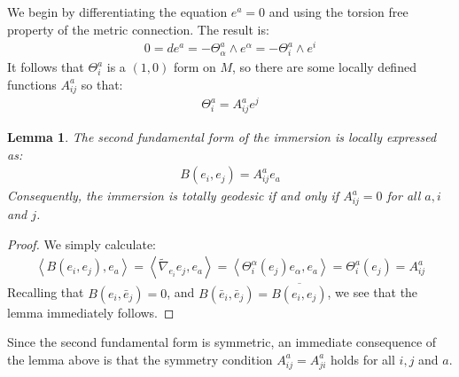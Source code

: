 \documentclass[11pt]{amsart}
\newtheorem{lem}[subsection]{Lemma}
\theoremstyle{definition}
\def \la { \left\langle }
\def \ra { \right\rangle }
\def \nablaamb{ \tilde{\nabla} }
\begin{document}
We begin by differentiating the equation $e^a = 0$ and using the torsion free property of the metric connection.  The result is:
%
\begin{align*}
0 = d e^a = - \Theta^a_{\alpha} \wedge e^{\alpha} = - \Theta^a_i \wedge e^i
\end{align*}
%
It follows that $\Theta^a_i$ is a $(1,0)$ form on $M$, so there are some locally defined functions $A^a_{ij}$ so that:
%
\begin{align}
\Theta^a_i = A^a_{ij} e^j
\end{align}

\begin{lem} The second fundamental form of the immersion is locally expressed as:
%
\begin{align}
B( e_i, e_j ) = A^a_{ij} e_a
\end{align}
%
Consequently, the immersion is totally geodesic if and only if $A^a_{ij} = 0$ for all $a,i$ and $j$.
%
\end{lem}

\begin{proof} We simply calculate:
%
\begin{align*}
\la B(e_i, e_j), e_a \ra = \la \nablaamb_{e_i} e_j, e_a \ra = \la \Theta^{\alpha}_i (e_j) e_{\alpha}, e_a \ra = \Theta^a_i (e_j) = A^a_{ij}
\end{align*}
%
Recalling that $B(e_i, \bar{e}_j) = 0$, and $B(\bar{e}_i, \bar{e}_j ) = \overline{ B(e_i, e_j ) }$, we see that the lemma immediately follows.
%
\end{proof}

Since the second fundamental form is symmetric, an immediate consequence of the lemma above is that the symmetry condition $A^a_{ij} = A^a_{ji}$ holds for all $i,j$ and $a$.
\end{document}
